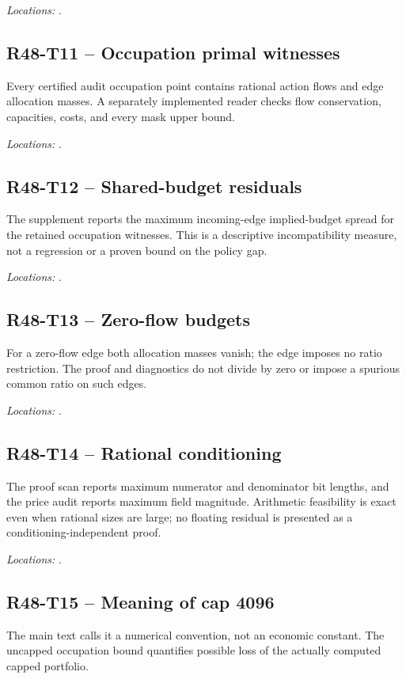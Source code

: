 \noindent\emph{Locations:} .

\subsection{R48-T11 -- Occupation primal witnesses}
Every certified audit occupation point contains rational action flows and edge allocation masses. A separately implemented reader checks flow conservation, capacities, costs, and every mask upper bound.

\noindent\emph{Locations:} .

\subsection{R48-T12 -- Shared-budget residuals}
The supplement reports the maximum incoming-edge implied-budget spread for the retained occupation witnesses. This is a descriptive incompatibility measure, not a regression or a proven bound on the policy gap.

\noindent\emph{Locations:} .

\subsection{R48-T13 -- Zero-flow budgets}
For a zero-flow edge both allocation masses vanish; the edge imposes no ratio restriction. The proof and diagnostics do not divide by zero or impose a spurious common ratio on such edges.

\noindent\emph{Locations:} .

\subsection{R48-T14 -- Rational conditioning}
The proof scan reports maximum numerator and denominator bit lengths, and the price audit reports maximum field magnitude. Arithmetic feasibility is exact even when rational sizes are large; no floating residual is presented as a conditioning-independent proof.

\noindent\emph{Locations:} .

\subsection{R48-T15 -- Meaning of cap 4096}
The main text calls it a numerical convention, not an economic constant. The uncapped occupation bound quantifies possible loss of the actually computed capped portfolio.


